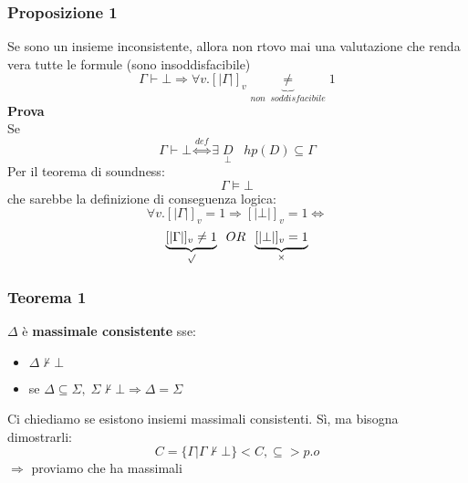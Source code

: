 \documentclass{article}
\theoremstyle{break}
\theoremstyle{break}
\theoremstyle{break}
\theoremstyle{break}
\begin{document}
\subsubsection{Proposizione 1}
Se sono un insieme inconsistente, allora non rtovo mai una valutazione che renda vera tutte le formule (sono insoddisfacibile)
\[
  \Gamma \vdash \bot \Rightarrow \forall v. [|\Gamma|]_v \underbrace{\neq}_{non\;\; soddisfacibile} 1
\] 
\textbf{Prova}\\
Se
\[
  \Gamma \vdash \bot \stackrel{def}{\Leftrightarrow} \exists \;\underset{\bot}{D} \;\;\; hp(D) \subseteq \Gamma
\] 
Per il teorema di soundness:
\[
\Gamma \models \bot
\] 
che sarebbe la definizione di conseguenza logica:
\[
  \forall v. [|\Gamma|]_v=1 \Rightarrow [|\bot|]_v=1 \Leftrightarrow
\] 
\[
  \underbrace{[|\Gamma|]_v \neq 1}_{\surd} \;\;OR\;\; \underbrace{[|\bot|]_v=1}_{\times }
\] 

\subsubsection{Teorema 1}
\begin{definition}
  \( \Delta \) è \textbf{massimale consistente} sse:
  \begin{itemize}
    \item \( \Delta \not\vdash \bot \) 
    \item se \( \Delta \subseteq \Sigma,\; \Sigma \not\vdash \bot \Rightarrow \Delta = \Sigma \)
  \end{itemize}
  Ci chiediamo se esistono insiemi massimali consistenti. Sì, ma bisogna dimostrarli:
  \[
  C = \{\Gamma | \Gamma \not\vdash \bot\} <C,\subseteq> p.o
  \] 
  \( \Rightarrow \) proviamo che ha massimali
\end{definition}
\end{document}
